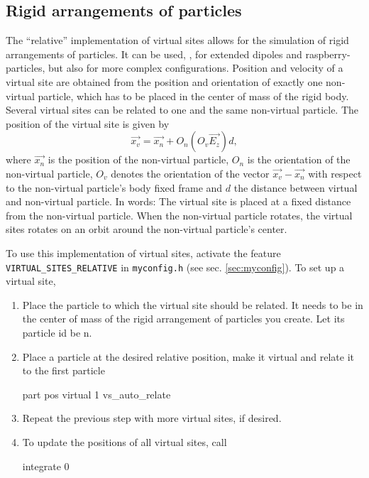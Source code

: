 \subsection{Rigid arrangements of particles}

The ``relative'' implementation of virtual sites allows for the
simulation of rigid arrangements of particles. It can be used, \eg,
for extended dipoles and raspberry-particles, but also for more
complex configurations.  Position and velocity of a virtual site are
obtained from the position and orientation of exactly one non-virtual
particle, which has to be placed in the center of mass of the rigid
body. Several virtual sites can be related to one and the same
non-virtual particle.  The position of the virtual site is given by
\begin{equation}
\vec{x_v} =\vec{x_n} +O_n (O_v \vec{E_z}) d,
\end{equation}
where $\vec{x_n}$ is the position of the non-virtual particle, $O_n$
is the orientation of the non-virtual particle, $O_v$ denotes the
orientation of the vector $\vec{x_v}-\vec{x_n}$ with respect to the
non-virtual particle's body fixed frame and $d$ the distance between
virtual and non-virtual particle.  In words: The virtual site is
placed at a fixed distance from the non-virtual particle. When the
non-virtual particle rotates, the virtual sites rotates on an orbit
around the non-virtual particle's center.

To use this implementation of virtual sites, activate the feature
\texttt{VIRTUAL_SITES_RELATIVE} in \texttt{myconfig.h} (see
sec. \ref{sec:myconfig}).  To set up a virtual site,
\begin{enumerate}
\item Place the particle to which the virtual site should be
  related. It needs to be in the center of mass of the rigid
  arrangement of particles you create. Let its particle id be n.
\item Place a particle at the desired relative position, make it
  virtual and relate it to the first particle
  \begin{essyntaxbox}
    part  pos  virtual 1 vs_auto_relate 
  \end{essyntaxbox}
\item Repeat the previous step with more virtual sites, if desired.
\item To update the positions of all virtual sites, call
  \begin{essyntaxbox}
    integrate 0
  \end{essyntaxbox}
\end{enumerate}

